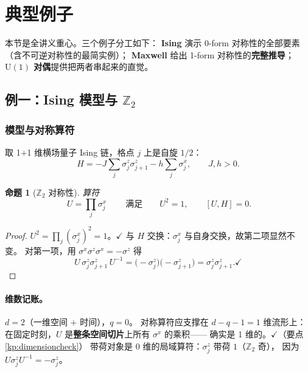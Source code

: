 \documentclass[UTF8,a4paper,11pt]{ctexart}
\theoremstyle{plain}
\newtheorem{proposition}{命题}[section]
\theoremstyle{definition}
\theoremstyle{remark}
\newcommand{\ZZ}{\mathbb{Z}}
\newcommand{\Uone}{\mathrm{U}(1)}
\newcommand{\Uop}{U}
\begin{document}
\section{典型例子}
\label{sec:examples}

本节是全讲义重心。三个例子分工如下：
\textbf{Ising} 演示 0-form 对称性的全部要素（含不可逆对称性的最简实例）；
\textbf{Maxwell} 给出 1-form 对称性的\textbf{完整推导}；
\textbf{$\Uone$ 对偶}提供把两者串起来的直觉。

\subsection{例一：Ising 模型与 \texorpdfstring{$\ZZ_2$}{Z2}}
\label{subsec:ising}

\subsubsection{模型与对称算符}

取 1$+$1 维横场量子 Ising 链，格点 $j$ 上是自旋 $1/2$：
\begin{equation}
  H=-J\sum_j \sigma^z_j\sigma^z_{j+1}-h\sum_j\sigma^x_j,
  \qquad J,h>0 .
  \label{eq:ising}
\end{equation}

\begin{proposition}[$\ZZ_2$ 对称性]
算符
\begin{equation}
  \boxed{\ \Uop=\prod_j\sigma^x_j\ }
  \qquad\text{满足}\qquad
  \Uop^2=1,\qquad [\Uop,H]=0 .
  \label{eq:isingU}
\end{equation}
\end{proposition}

\begin{proof}
$\Uop^2=\prod_j(\sigma^x_j)^2=1$。$\checkmark$
与 $H$ 交换：$\sigma^x_j$ 与自身交换，故第二项显然不变。
对第一项，用 $\sigma^x\sigma^z\sigma^x=-\sigma^z$ 得
\begin{equation}
  \Uop\,\sigma^z_j\sigma^z_{j+1}\,\Uop^{-1}
  =\big(-\sigma^z_j\big)\big(-\sigma^z_{j+1}\big)
  =\sigma^z_j\sigma^z_{j+1} . \checkmark
\end{equation}
\end{proof}

\paragraph{维数记账。}$d=2$（一维空间 $+$ 时间），$q=0$。
对称算符应支撑在 $d-q-1=1$ 维流形上：
在固定时刻，$\Uop$ 是\textbf{整条空间切片}上所有 $\sigma^x$ 的乘积——
确实是 1 维的。$\checkmark$（要点 \ref{kp:dimensioncheck}）
带荷对象是 0 维的局域算符：$\sigma^z_j$ 带荷 $1$（$\ZZ_2$ 奇），
因为 $\Uop\sigma^z_j\Uop^{-1}=-\sigma^z_j$。
\end{document}
